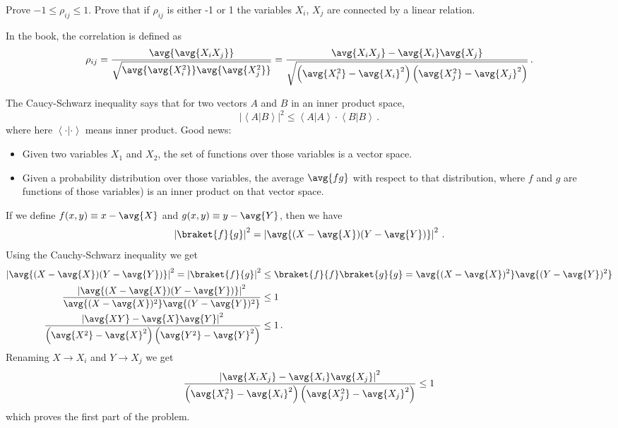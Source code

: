 

Prove $-1 \leq \rho_{ij} \leq 1$.
Prove that if $\rho_{ij}$ is either -1 or 1 the variables $X_i$, $X_j$ are connected by a linear relation.

In the book, the correlation is defined as
\begin{equation*}
\rho_{ij}
= \frac{\avg{\avg{X_i X_j}}}{\sqrt{\avg{\avg{X_i^2}} \avg{\avg{X_j^2}}}}
= \frac{\avg{X_i X_j}
- \avg{X_i}\avg{X_j}}{
\sqrt{\left(\avg{X_i^2} - \avg{X_i}^2 \right) \left( \avg{X_j^2} - \avg{X_j}^2 \right)}
} \, .
\end{equation*}


The Caucy-Schwarz inequality says that for two vectors $A$ and $B$ in an inner product space,
\begin{equation*}
\left\lvert \left \langle A | B \right \rangle \right\vert ^2
\leq \left\langle A | A \right\rangle \cdot \left\langle B | B \right\rangle \, .
\end{equation*}
where here $\left \langle \cdot | \cdot \right \rangle$ means inner product.
Good news:
\begin{itemize}
\item Given two variables $X_1$ and $X_2$, the set of functions over those variables is a vector space.
\item Given a probability distribution over those variables, the average $\avg{f g}$ with respect to that distribution, where $f$ and $g$ are functions of those variables) is an inner product on that vector space.
\end{itemize}
If we define $f(x,y) \equiv x - \avg{X}$ and $g(x,y) \equiv y - \avg{Y}$, then we have
\begin{equation*}
\left \lvert \braket{f}{g} \right \rvert^2
= \left \lvert \avg{(X - \avg{X})(Y - \avg{Y})} \right \rvert^2 \, .
\end{equation*}
Using the Cauchy-Schwarz inequality we get
\begin{align*}
\left \lvert \avg{(X - \avg{X})(Y - \avg{Y})} \right \rvert^2
= \left \lvert \braket{f}{g} \right \rvert^2
&\leq \braket{f}{f} \braket{g}{g}
= \avg{(X - \avg{X})^2} \avg{(Y - \avg{Y})^2} \\
\frac{
\left \lvert \avg{(X - \avg{X})(Y - \avg{Y})} \right \rvert^2}
{
\avg{(X - \avg{X})^2} \avg{(Y - \avg{Y})^2}}
&\leq 1 \\
\frac{
\left \lvert \avg{XY} - \avg{X}\avg{Y} \right \rvert^2}
{
\left(\avg{X^2} - \avg{X}^2 \right) \left( \avg{Y^2} - \avg{Y}^2 \right)}
&\leq 1 \, .
\end{align*}
Renaming $X \rightarrow X_i$ and $Y \rightarrow X_j$ we get\
\begin{equation*}
\frac{
\left \lvert \avg{X_i X_j} - \avg{X_i}\avg{X_j} \right \rvert^2}
{
\left(\avg{X_i^2} - \avg{X_i}^2 \right) \left( \avg{X_j^2} - \avg{X_j}^2 \right)}
\leq 1
\end{equation*}
which proves the first part of the problem.


